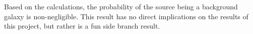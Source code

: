 Based on the calculations, the probability of the source being a background galaxy is non-negligible. This result has no direct implications on the results of this project, but rather is a fun side branch result. 


